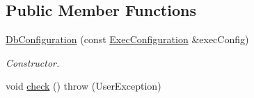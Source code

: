 \subsection*{Public Member Functions}
\begin{DoxyCompactItemize}
\item 
\hyperlink{classDbConfiguration_a73a8fd3f4ec046313d88ae413023613c}{DbConfiguration} (const \hyperlink{classExecConfiguration}{ExecConfiguration} \&execConfig)
\begin{DoxyCompactList}\small\item\em Constructor. \item\end{DoxyCompactList}\item 
\hypertarget{classDbConfiguration_a7a47e574a865c80032a59b3b3eca9991}{
void \hyperlink{classDbConfiguration_a7a47e574a865c80032a59b3b3eca9991}{check} ()  throw (UserException)}
\label{classDbConfiguration_a7a47e574a865c80032a59b3b3eca9991}


\end{DoxyCompactItemize}
